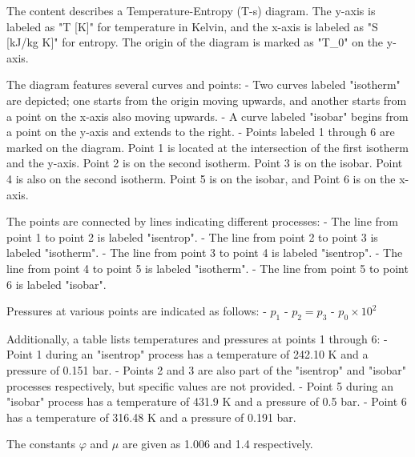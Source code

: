 The content describes a Temperature-Entropy (T-s) diagram. The y-axis is labeled as "T [K]" for temperature in Kelvin, and the x-axis is labeled as "S [kJ/kg K]" for entropy. The origin of the diagram is marked as "T_0" on the y-axis.

The diagram features several curves and points:
- Two curves labeled "isotherm" are depicted; one starts from the origin moving upwards, and another starts from a point on the x-axis also moving upwards.
- A curve labeled "isobar" begins from a point on the y-axis and extends to the right.
- Points labeled 1 through 6 are marked on the diagram. Point 1 is located at the intersection of the first isotherm and the y-axis. Point 2 is on the second isotherm. Point 3 is on the isobar. Point 4 is also on the second isotherm. Point 5 is on the isobar, and Point 6 is on the x-axis.

The points are connected by lines indicating different processes:
- The line from point 1 to point 2 is labeled "isentrop".
- The line from point 2 to point 3 is labeled "isotherm".
- The line from point 3 to point 4 is labeled "isentrop".
- The line from point 4 to point 5 is labeled "isotherm".
- The line from point 5 to point 6 is labeled "isobar".

Pressures at various points are indicated as follows:
- \( p_1 \)
- \( p_2 = p_3 \)
- \( p_0 \times 10^2 \)

Additionally, a table lists temperatures and pressures at points 1 through 6:
- Point 1 during an "isentrop" process has a temperature of 242.10 K and a pressure of 0.151 bar.
- Points 2 and 3 are also part of the "isentrop" and "isobar" processes respectively, but specific values are not provided.
- Point 5 during an "isobar" process has a temperature of 431.9 K and a pressure of 0.5 bar.
- Point 6 has a temperature of 316.48 K and a pressure of 0.191 bar.

The constants \( \varphi \) and \( \mu \) are given as 1.006 and 1.4 respectively.